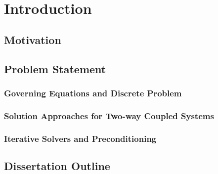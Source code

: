 \chapter{Introduction}

\section{Motivation}

\section{Problem Statement}

\subsection{Governing Equations and Discrete Problem}

\subsection{Solution Approaches for Two-way Coupled Systems}

\subsection{Iterative Solvers and Preconditioning}

\section{Dissertation Outline}